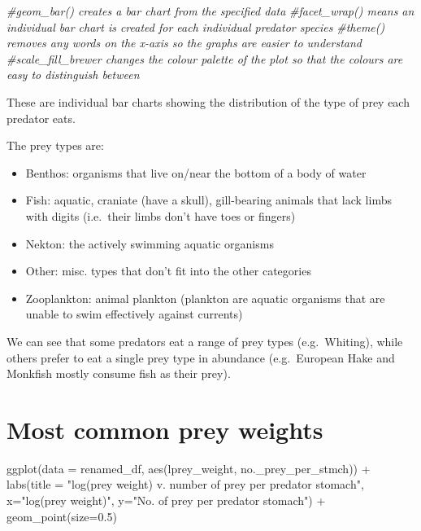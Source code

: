 \documentclass[
]{article}
\newenvironment{Shaded}{\begin{snugshade}}{\end{snugshade}}
\newcommand{\AttributeTok}[1]{\textcolor[rgb]{0.77,0.63,0.00}{#1}}
\newcommand{\CommentTok}[1]{\textcolor[rgb]{0.56,0.35,0.01}{\textit{#1}}}
\newcommand{\FloatTok}[1]{\textcolor[rgb]{0.00,0.00,0.81}{#1}}
\newcommand{\FunctionTok}[1]{\textcolor[rgb]{0.00,0.00,0.00}{#1}}
\newcommand{\NormalTok}[1]{#1}
\newcommand{\SpecialCharTok}[1]{\textcolor[rgb]{0.00,0.00,0.00}{#1}}
\newcommand{\StringTok}[1]{\textcolor[rgb]{0.31,0.60,0.02}{#1}}
\providecommand{\tightlist}{%
  \setlength{\itemsep}{0pt}\setlength{\parskip}{0pt}}
\begin{document}
\begin{Shaded}
\begin{Highlighting}[]
\CommentTok{\#geom\_bar() creates a bar chart from the specified data}
\CommentTok{\#facet\_wrap() means an individual bar chart is created for each individual predator species}
\CommentTok{\#\textquotesingle{}theme()\textquotesingle{} removes any words on the x{-}axis so the graphs are easier to understand}
\CommentTok{\#scale\_fill\_brewer changes the colour palette of the plot so that the colours are easy to distinguish between}
\end{Highlighting}
\end{Shaded}

These are individual bar charts showing the distribution of the type of
prey each predator eats.

The prey types are:

\begin{itemize}
\tightlist
\item
  Benthos: organisms that live on/near the bottom of a body of water
\item
  Fish: aquatic, craniate (have a skull), gill-bearing animals that lack
  limbs with digits (i.e.~their limbs don't have toes or fingers)
\item
  Nekton: the actively swimming aquatic organisms
\item
  Other: misc. types that don't fit into the other categories
\item
  Zooplankton: animal plankton (plankton are aquatic organisms that are
  unable to swim effectively against currents)
\end{itemize}

We can see that some predators eat a range of prey types (e.g.~Whiting),
while others prefer to eat a single prey type in abundance
(e.g.~European Hake and Monkfish mostly consume fish as their prey).

\hypertarget{most-common-prey-weights}{%
\section{Most common prey weights}\label{most-common-prey-weights}}

\begin{Shaded}
\begin{Highlighting}[]
\FunctionTok{ggplot}\NormalTok{(}\AttributeTok{data =}\NormalTok{ renamed\_df, }\FunctionTok{aes}\NormalTok{(lprey\_weight, no.\_prey\_per\_stmch)) }\SpecialCharTok{+} 
      \FunctionTok{labs}\NormalTok{(}\AttributeTok{title =} \StringTok{"log(prey weight) v. number of prey per predator stomach"}\NormalTok{, }
       \AttributeTok{x=}\StringTok{"log(prey weight)"}\NormalTok{, }\AttributeTok{y=}\StringTok{"No. of prey per predator stomach"}\NormalTok{) }\SpecialCharTok{+} 
      \FunctionTok{geom\_point}\NormalTok{(}\AttributeTok{size=}\FloatTok{0.5}\NormalTok{)}
\end{Highlighting}
\end{Shaded}
\end{document}
